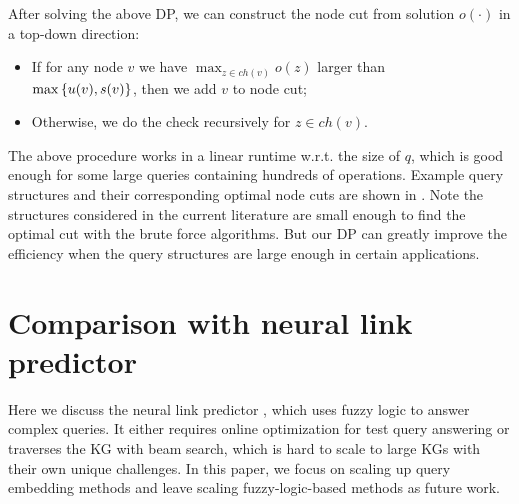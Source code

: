 After solving the above DP, we can construct the node cut from solution $o(\cdot)$ in a top-down direction:
\begin{itemize}[noitemsep,topsep=0pt,parsep=0pt,partopsep=0pt, leftmargin=*]
	\item If for any node $v$ we have $\max_{z \in ch(v)} o(z)$ larger than\\ $\max\left\{u(v), s(v)\right\}$, then we add $v$ to node cut;
	\item Otherwise, we do the check recursively for $z \in ch(v)$. 
\end{itemize}

The above procedure works in a linear runtime w.r.t. the size of $q$, which is good enough for some large queries containing hundreds of operations. Example query structures and their corresponding optimal node cuts are shown in . Note the structures considered in the current literature are small enough to find the optimal cut with the brute force algorithms. But our DP can greatly improve the efficiency when the query structures are large enough in certain applications.

\section{Comparison with neural link predictor \cite{arakelyan2020complex}}\label{app:link-predictor}
Here we discuss the neural link predictor \cite{arakelyan2020complex}, which uses fuzzy logic to answer complex queries. It either requires online optimization for test query answering or traverses the KG with beam search, which is hard to scale to large KGs with their own unique challenges. In this paper, we focus on scaling up query embedding methods and leave scaling fuzzy-logic-based methods as future work.

